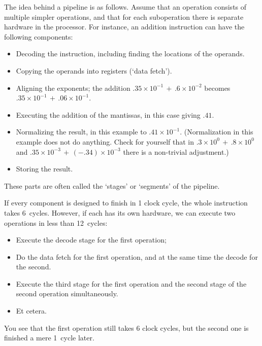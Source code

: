 
The idea behind a
pipeline is as follows. Assume that an operation consists of multiple
simpler operations, and that for each suboperation there is separate
hardware in the processor.
For instance, an addition instruction can have the following components:
\begin{itemize}
\item Decoding the instruction, including finding the locations of the
  operands.
\item Copying the operands into registers (`data fetch').
\item Aligning the exponents; the addition
  $.35\times 10^{-1}\,+\, .6\times 10^{-2}$ becomes 
  $.35\times 10^{-1}\,+\, .06\times 10^{-1}$.
\item Executing the addition of the mantissas, in this case giving 
  $.41$.
\item Normalizing the result, in this example to $.41\times
  10^{-1}$. (Normalization in this example does not do anything. Check
  for yourself that in 
  $.3\times10^0\,+\,.8\times 10^0$ and 
  $.35\times10^{-3}\,+\,(-.34)\times 10^{-3}$ there is a non-trivial
  adjustment.)
\item Storing the result.
\end{itemize}
These parts are often called the `stages' or `segments' of the pipeline.

If every component is designed to finish in 1 clock cycle, the whole
instruction takes 6~cycles. However, if each has its own hardware, we
can execute two operations in less than 12~cycles:
\begin{itemize}
\item Execute the decode stage for the first operation;
\item Do the data fetch for the first operation, and at the same time
  the decode for the second.
\item Execute the third stage for the first operation and the second
  stage of the second operation simultaneously.
\item Et cetera.
\end{itemize}
You see that the first operation still takes 6 clock cycles, but the
second one is finished a mere 1~cycle later. 

